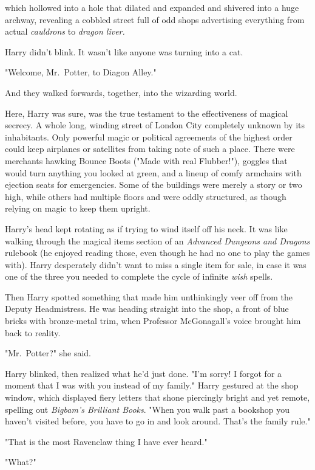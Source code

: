 {\el} which hollowed into a hole that dilated and expanded and
shivered into a huge archway, revealing a cobbled street full of
odd shops advertising everything from actual \emph{cauldrons} to
\emph{dragon liver.}

Harry didn't blink. It wasn't like anyone was turning into a cat.

"Welcome, Mr.~Potter, to Diagon Alley."

And they walked forwards, together, into the wizarding world.

Here, Harry was sure, was the true testament to the
effectiveness of magical secrecy. A whole long, winding
street of London City completely unknown by its
inhabitants. Only powerful magic or political agreements of
the highest order could keep airplanes or satellites from
taking note of such a place. There were merchants hawking
Bounce Boots ("Made with real Flubber!"),
goggles that would turn anything you looked at green, and
a lineup of comfy armchairs with ejection seats for
emergencies. Some of the buildings were merely a story
or two high, while others had multiple floors and were
oddly structured, as though relying on magic to keep them upright.

Harry's head kept rotating as if trying to wind itself off his
neck. It was like walking through the magical items section of an
\emph{Advanced Dungeons and Dragons} rulebook (he enjoyed
reading those, even though he had no one
to play the games with). Harry desperately didn't want to miss a
single item for sale, in case it was one of the three you needed to complete
the cycle of infinite \emph{wish} spells.

Then Harry spotted something that made him unthinkingly
veer off from the Deputy Headmistress.
He was heading straight into the shop, a front of blue bricks
with bronze-metal trim, when Professor McGonagall's voice
brought him back to reality.

"Mr.~Potter?" she said.

Harry blinked, then realized what he'd just done. "I'm sorry! I forgot for a
moment that I was with you instead of my family." Harry gestured at the shop
window, which displayed fiery letters that shone piercingly bright and yet
remote, spelling out \emph{Bigbam's Brilliant Books}. "When you walk past a
bookshop you haven't visited before, you have to go in and look around. That's
the family rule."

"That is the most Ravenclaw thing I have ever heard."

"What?"

